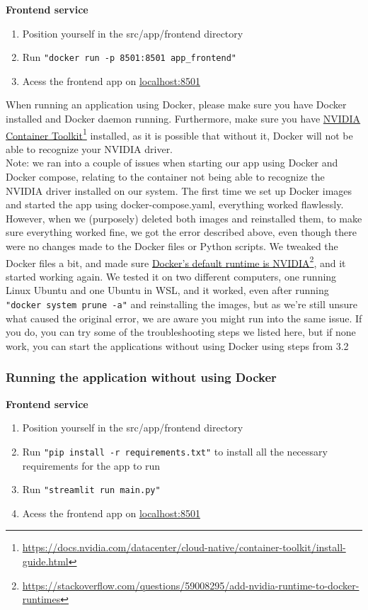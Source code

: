 \documentclass{ol-softwaremanual}
\newcommand{\doclink}[2]{\href{#1}{#2}\footnote{\url{#1}}}
\begin{document}
\textbf{Frontend service}
\begin{enumerate}
\item Position yourself in the src/app/frontend directory
\item Run \texttt{"docker run -p 8501:8501 app\_frontend"}
\item Acess the frontend app on \url{localhost:8501}
\end{enumerate}

When running an application using Docker, please make sure you have Docker installed and Docker daemon running. Furthermore, make sure you have  \doclink{https://docs.nvidia.com/datacenter/cloud-native/container-toolkit/install-guide.html}{NVIDIA Container Toolkit} installed, as it is possible that without it, Docker will not be able to recognize your NVIDIA driver. \\

Note: we ran into a couple of issues when starting our app using Docker and Docker compose, relating to the container not being able to recognize the NVIDIA driver installed on our system. The first time we set up Docker images and started the app using docker-compose.yaml, everything worked flawlessly. However, when we (purposely) deleted both images and reinstalled them, to make sure everything worked fine, we got the error described above, even though there were no changes made to the Docker files or Python scripts. We tweaked the Docker files a bit, and made sure \doclink{https://stackoverflow.com/questions/59008295/add-nvidia-runtime-to-docker-runtimes}{Docker's default runtime is NVIDIA}, and it started working again. We tested it on two different computers, one running Linux Ubuntu and one Ubuntu in WSL, and it worked, even after running \texttt{"docker system prune -a"} and reinstalling the images, but as we're still unsure what caused the original error, we are aware you might run into the same issue. If you do, you can try some of the troubleshooting steps we listed here, but if none work, you can start the applications without using Docker using steps from 3.2

\subsubsection{Running the application without using Docker}

\textbf{Frontend service}

\begin{enumerate}
\item Position yourself in the src/app/frontend directory
\item Run \texttt{"pip install -r requirements.txt"} to install all the necessary requirements for the app to run
\item Run \texttt{"streamlit run main.py"}
\item Acess the frontend app on \url{localhost:8501}
\end{enumerate}
\end{document}
